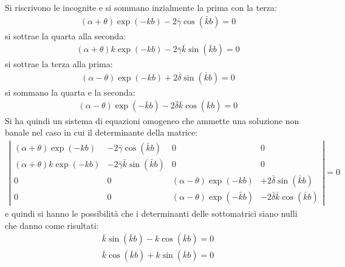 Si riscrivono le incognite e si sommano inzialmente la prima con la terza:
\begin{equation}\begin{split}
\left(\alpha+\theta\right)\exp{\left(-kb\right)}-2\bar \gamma\cos{\left(\bar kb\right)}=0
\end{split}\end{equation}
si sottrae la quarta alla seconda:
\begin{equation}\begin{split}
\left(\alpha+\theta\right)k\exp{\left(-kb\right)}-2\bar \gamma\bar k\sin{\left(\bar kb\right)}=0
\end{split}\end{equation}
si sottrae la terza alla prima:
\begin{equation}\begin{split}
\left(\alpha-\theta\right)\exp{\left(-kb\right)}+2\bar \delta\sin{\left(\bar kb\right)}=0
\end{split}\end{equation}
si sommano la quarta e la seconda:
\begin{equation}\begin{split}
\left(\alpha-\theta\right)\exp{\left(-\bar kb\right)}-2\bar \delta \bar k\cos{\left(\bar kb\right)}=0
\end{split}\end{equation}
Si ha quindi un sistema di equazioni omogeneo che ammette una soluzione non banale nel caso in cui il determinante della matrice:
\begin{equation}\begin{split}
\left|\begin{matrix}
\left(\alpha+\theta\right)\exp{\left(-kb\right)} & -2\bar \gamma\cos{\left(\bar kb\right)} & 0 & 0 \\
\left(\alpha+\theta\right)k\exp{\left(-kb\right)} & -2\bar \gamma\bar k\sin{\left(\bar kb\right)} & 0 & 0 \\
0 & 0 & \left(\alpha-\theta\right)\exp{\left(-kb\right)} & +2\bar \delta\sin{\left(\bar kb\right)} \\
0 & 0 & \left(\alpha-\theta\right)\exp{\left(-\bar kb\right)} & -2\bar \delta\bar k\cos{\left(\bar kb\right)}
\end{matrix}\right|=0
\end{split}\end{equation}
e quindi si hanno le possibilità che i determinanti delle sottomatrici siano nulli che danno come risultati:
\begin{equation}\begin{split}
\bar k\sin{\left(\bar kb\right)}-k\cos{\left(\bar kb\right)}=0 \\
\bar k\cos{\left(\bar kb\right)}+k\sin{\left(\bar kb\right)}=0
\end{split}\end{equation}

